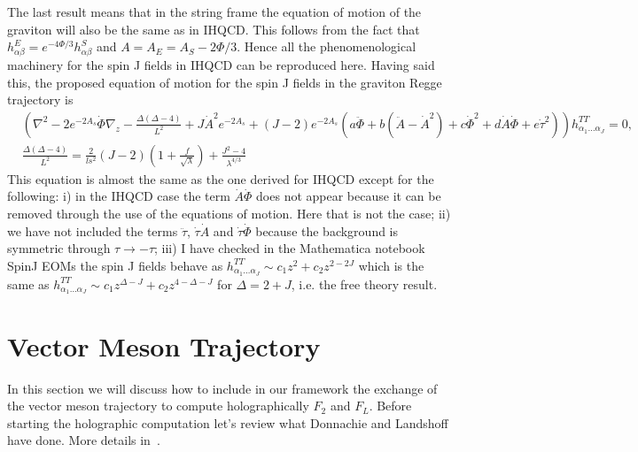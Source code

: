 \documentclass[a4paper,12pt]{article}
\begin{document}
The last result means that in the string frame the equation of motion of the graviton will also be the same as in IHQCD. This follows from the fact that $h^E_{\alpha \beta} = e^{- 4 \Phi / 3} h^S_{\alpha \beta}$ and $A = A_E = A_S - 2 \Phi / 3$. Hence all the phenomenological machinery for the spin J fields in IHQCD can be reproduced here. Having said this,
the proposed equation of motion for the spin J fields in the graviton Regge trajectory is
\begin{align}
&\left( \nabla^2 - 2 e^{-2A_s} \dot{\Phi} \nabla_z - \frac{\Delta ( \Delta - 4 )}{L^2} + J {\dot{A}}^2 e^{-2A_s} + \left( J - 2\right) e^{-2A_s} \left( a \ddot{\Phi} + b \left( \ddot{A} - {\dot{A}}^2 \right) + c {\dot{\Phi}}^2 + d \dot{A} \dot{\Phi} + e {\dot{\tau}}^2  \right)\right) h^{TT}_{\alpha_1 \dots \alpha_J} = 0, \\
&\frac{\Delta ( \Delta - 4 )}{L^2}  = \frac{2}{ls^2} \left(J - 2 \right) \left( 1 + \frac{f}{\sqrt{\lambda}} \right) + \frac{J^2 -4}{\lambda^{4/3}}
\end{align}
This equation is almost the same as the one derived for IHQCD except for the following: i) in the IHQCD case the term $\dot{A} \dot{\Phi}$ does not appear because it can be removed through the use of the equations of motion. Here that is not the case; ii) we have not included the terms $\ddot{\tau}$, $\dot{\tau} \dot{A}$ and $\dot{\tau} \dot{\Phi}$ because the background is symmetric through $\tau \rightarrow - \tau$; iii) I have checked in the Mathematica notebook SpinJ EOMs the spin J fields behave as $h^{TT}_{\alpha_1 \dots \alpha_J} \sim c_1 z^2 + c_2 z^{2-2 J}$ which is the same as  $h^{TT}_{\alpha_1 \dots \alpha_J} \sim c_1 z^{\Delta - J} + c_2 z^{4 - \Delta -J}$ for $\Delta = 2 + J$, i.e. the free theory result.


\section{Vector Meson Trajectory}

In this section we will discuss how to include in our framework the exchange of the vector meson trajectory to compute holographically $F_2$ and $F_L$. Before starting the holographic computation let's review what Donnachie and Landshoff have done. More details in~\cite{donnachie_dosch_landshoff_nachtmann_2002}.
\end{document}
